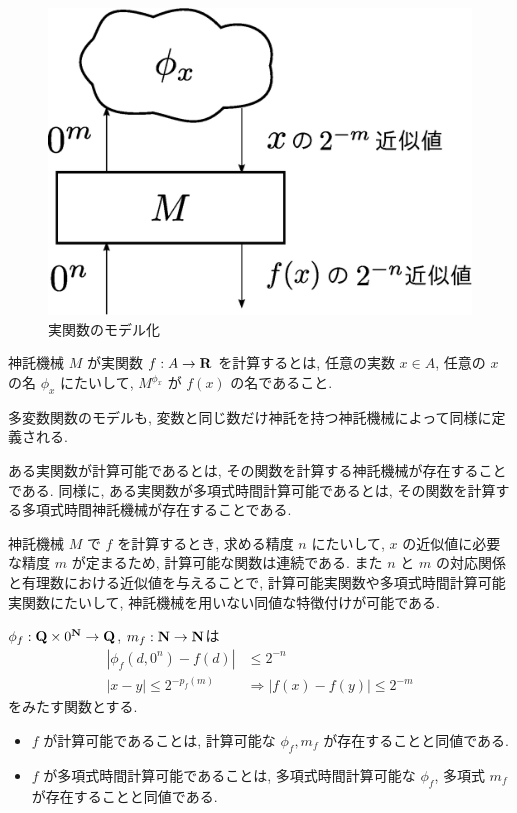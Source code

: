  \begin{figure}
  \label{fig:model-of-function}
  \begin{center}
   \includegraphics[height=0.15\textheight]{image/model-of-function.eps}
  \end{center}
  \caption{実関数のモデル化}
 \end{figure}

 \begin{definition}
  神託機械 $M$ が実関数 $f:A \to \mathbf R$ を計算するとは,
  任意の実数 $x \in A$, 任意の $x$ の名 $\phi_x$ にたいして,
  $M^{\phi_x}$ が $f(x)$ の名であること.
 \end{definition}

 多変数関数のモデルも, 変数と同じ数だけ神託を持つ神託機械によって同様に定義される.

 ある実関数が計算可能であるとは, その関数を計算する神託機械が存在することである.
 同様に, ある実関数が多項式時間計算可能であるとは, その関数を計算する多項式時間神託機械が存在することである.
 

 神託機械 $M$ で $f$ を計算するとき, 求める精度 $n$ にたいして,
 $x$ の近似値に必要な精度 $m$ が定まるため,
 計算可能な関数は連続である.
 また $n$ と $m$ の対応関係と有理数における近似値を与えることで,
 計算可能実関数や多項式時間計算可能実関数にたいして,
 神託機械を用いない同値な特徴付けが可能である.

 \begin{lemma}
 $\phi_f: \mathbf Q \times 0^\mathbf N \to \mathbf Q$, $m_f: \mathbf N \to \mathbf N$は
 \begin{align}
  |\phi_f(d, 0^n) - f(d)| &\le 2^{-n} \\
  |x-y| \le 2^{-p_f(m)} &\Rightarrow |f(x) - f(y)| \le 2^{-m}
 \end{align}
 をみたす関数とする.
  \begin{itemize}
   \item $f$ が計算可能であることは, 計算可能な $\phi_f, m_f$ が存在することと同値である. 
   \item $f$ が多項式時間計算可能であることは, 多項式時間計算可能な 
  $\phi_f$, 多項式 $m_f$ が存在することと同値である.
  \end{itemize}
\end{lemma}

